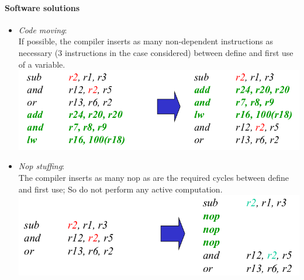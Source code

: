 \paragraph{Software solutions}
\begin{itemize}
    \item \textit{Code moving}:\\
    If possible, the compiler inserts as many non-dependent instructions as necessary (3 instructions in the case considered) between define and first use of a variable.\\
    \includegraphics[width=\textwidth]{images/data_hazard_sol1.png}
    
    \item \textit{Nop stuffing}:\\
    The compiler inserts as many nop as are the required cycles between define and first use; So do not perform any active computation.\\
    \includegraphics[width=\textwidth]{images/data_hazard_sol2.png}
\end{itemize}

